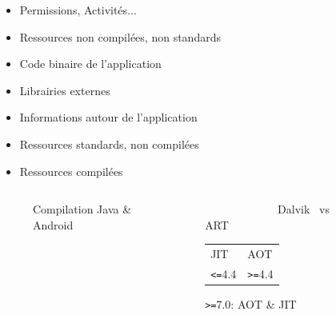 \documentclass[aspectratio=1610]{beamer}%
\begin{document}
\begin{frame}
\begin{columns}
\begin{column}{0.6\linewidth}
        {\scriptsize
        \begin{itemize}%
        \item<3-> [~] Permissions, Activités...
        \item<4-> [~] Ressources non compilées, non standards
        \item<5-> [~] Code binaire de l'application
        \item<6-> [~] Librairies externes
        \item<7-> [~] Informations autour de l'application
        \item<8-> [~] Ressources standards, non compilées
        \item<9-> [~] Ressources compilées
        \end{itemize}
        }
      \end{column}
    \end{columns}
  \end{frame}
  \begin{frame}
    \slidetitle[Compilation]
    \pause
    \begin{columns}
      \begin{column}{0.5\linewidth}
        \begin{figure}
          \vspace{-0.5cm}
          
          \vspace{-0.25cm}
          \caption{Compilation Java \& Android}
        \end{figure}
      \end{column}
    \begin{column}{0.5\linewidth}
      \pause
      \begin{block}{
        ~~~~~~~~~~~~~Dalvik \hfill ~vs \hfill ART~~~~~~~~~~~~
      }
        \pause
        \begin{tabularx}{\textwidth}{YY}
        JIT & AOT \\
        \texttt{<=}4.4 & \texttt{>=}4.4
        \end{tabularx}
        \centering
        \pause
        \texttt{>=}7.0: AOT \& JIT
      \end{block}
    \end{column}
  \end{columns}
\end{frame}
\end{document}
